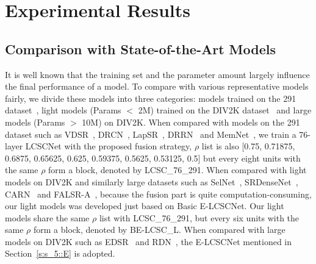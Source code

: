 \documentclass[journal]{IEEEtran}
\begin{document}
\section{Experimental Results}\label{s:s_6}

\subsection{Comparison with State-of-the-Art Models}

It is well known that the training set and the parameter amount largely influence the final performance of a model. To compare with various representative models fairly, we divide these models into three categories: models trained on the 291 dataset~\cite{yang2010image,martin2001database}, light models (Params $<$ 2M) trained on the DIV2K dataset~\cite{Agustsson_2017_CVPR_Workshops} and large models (Params $>$ 10M) on DIV2K. When compared with models on the 291 dataset such as VDSR~\cite{kim2016accurate}, DRCN~\cite{kim2016deeply}, LapSR~\cite{LapSRN}, DRRN~\cite{tai2017image} and MemNet~\cite{Tai-MemNet-2017}, we train a 76-layer LCSCNet with the proposed fusion strategy, $\rho$ list is also [0.75, 0.71875, 0.6875, 0.65625, 0.625, 0.59375, 0.5625, 0.53125, 0.5] but every eight units with the same $\rho$ form a block, denoted by LCSC\_76\_291. When compared with light models on DIV2K and similarly large datasets such as SelNet~\cite{choi2017deep}, SRDenseNet~\cite{tong2017image}, CARN~\cite{ahn2018fast} and FALSR-A~\cite{chu2019fast}, because the fusion part is quite computation-consuming, our light models was developed just based on Basic E-LCSCNet. Our light models share the same $\rho$ list with LCSC\_76\_291, but every six units with the same $\rho$ form a block, denoted by BE-LCSC\_L. When compared with large models on DIV2K such as EDSR~\cite{lim2017enhanced} and RDN~\cite{zhang2018residual}, the E-LCSCNet mentioned in Section~\ref{s:s_5::E} is adopted. 
\end{document}
